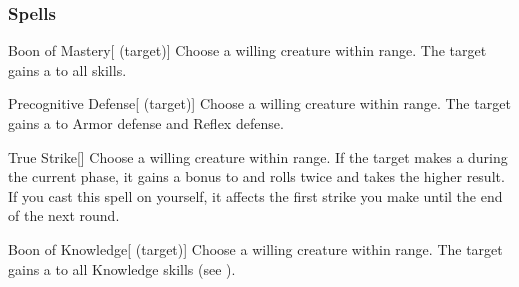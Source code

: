 \subsubsection{Spells}


\lowercase{\hypertarget{spell:Boon of Mastery}{}}\label{spell:Boon of Mastery}
\begin{attuneability}[\nth{1}]{\hypertarget{spell:Boon of Mastery}{Boon of Mastery}}[ (target)]
Choose a willing creature within \rngclose range.
The target gains a   to all skills.
\end{attuneability}
\vspace{0.25em}



\lowercase{\hypertarget{spell:Precognitive Defense}{}}\label{spell:Precognitive Defense}
\begin{attuneability}[\nth{1}]{\hypertarget{spell:Precognitive Defense}{Precognitive Defense}}[ (target)]
Choose a willing creature within \rngclose range.
The target gains a   to Armor defense and Reflex defense.
\end{attuneability}
\vspace{0.25em}



\lowercase{\hypertarget{spell:True Strike}{}}\label{spell:True Strike}
\begin{freeability}[\nth{1}]{\hypertarget{spell:True Strike}{True Strike}}[]
Choose a willing creature within \rngclose range.
If the target makes a  during the current phase,
it gains a  bonus to  and rolls twice and takes the higher result.
If you cast this spell on yourself, it affects the first strike you make until the end of the next round.
\end{freeability}
\vspace{0.25em}



\lowercase{\hypertarget{spell:Boon of Knowledge}{}}\label{spell:Boon of Knowledge}
\begin{attuneability}[\nth{2}]{\hypertarget{spell:Boon of Knowledge}{Boon of Knowledge}}[ (target)]
Choose a willing creature within \rngclose range.
The target gains a   to all Knowledge skills (see ).
\end{attuneability}
\vspace{0.25em}




